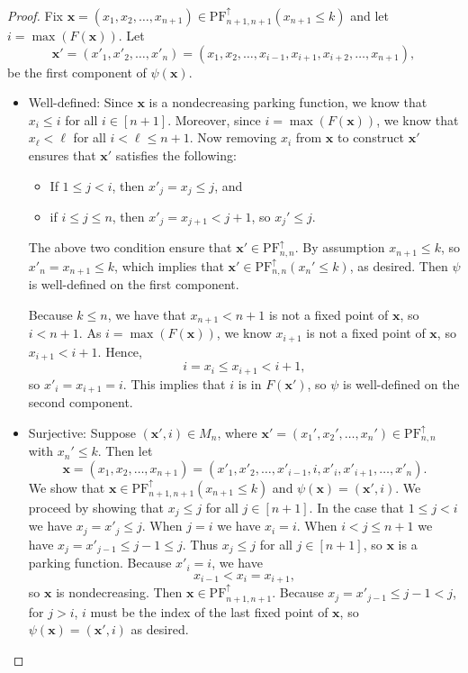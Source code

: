 \documentclass[11pt,reqno]{BICA}
\theoremstyle{definition}
\newcommand{\NDPF}{\mathrm{PF}^{\uparrow}}
\newcommand{\x}{\mathbf{x}}
\begin{document}
\begin{proof} Fix $\x=(x_1,x_2,\ldots,x_{n+1}) \in \NDPF_{n+1,n+1}(x_{n+1} \leq k)$ and  let $i=\max(F(\x))$. Let \[\x'=(x'_1,x'_2,\dots,x'_n)=(x_1,x_2,\ldots,x_{i-1},x_{i+1},x_{i+2},\ldots,x_{n+1}),\] be the first component of $\psi(\x)$.


    \begin{itemize}[leftmargin=.2in]
        \item Well-defined: 
        Since $\x$ is a nondecreasing parking function, we know that $x_i\leq i$ for all $i\in[n+1]$.
        Moreover, since $i=\max(F(\x))$, we know that $x_\ell<\ell$ for all $i<\ell\leq n+1$. 
        Now removing $x_i$ from $\x$ to construct $\x'$ ensures that $\x'$
        satisfies the following: 
        \begin{itemize}
            \item If $1\leq j < i$, then $x'_j = x_j\leq j$, and 
            \item if $i\leq j\leq n$, then $x'_j = x_{j+1}< j+1$, so $x_j'\leq j$.
        \end{itemize}
        The above two condition ensure that $\x'\in\NDPF_{n,n}$. 
        By assumption $x_{n+1}\leq k$, so $x'_n=x_{n+1}\leq k$, which implies that $\x'\in\NDPF_{n,n}(x_n'\leq k)$, as desired. 
        Then $\psi$ is well-defined on the first component. 
        
        Because $k\leq n$, we have that $x_{n+1} < n+1$ is not a fixed point of $\x$, so $i < n+1$. As $i=\max(F(\x))$, we know $x_{i+1}$ is not a fixed point of $\x$, so $x_{i+1} < i+1$. Hence, \begin{equation}\label{eq:fp-stays}i = x_i \leq x_{i+1} < i+1,\end{equation}
        so $x'_i = x_{i+1} = i$. This implies that $i$ is in $F(\x')$, so $\psi$ is well-defined on the second component.
    
        \item Surjective: Suppose $(\x', i) \in M_n$, where $\x'=(x_1',x_2',\ldots,x_n')\in\NDPF_{n,n}$ with $x_n'\leq k$. Then let
        \[\x =(x_1,x_2,\ldots,x_{n+1})= (x'_1, x'_2, \ldots, x'_{i-1}, i, x'_{i}, x'_{i+1}, \ldots, x'_{n}).\]
        We show that $\x\in\NDPF_{n+1,n+1}(x_{n+1}\leq k)$ and $\psi(\x) = (\x', i)$. We proceed by showing that $x_j\leq j$ for all $j\in[n+1]$.
        In the case that $1\leq j < i$ we have $x_j = x'_j \leq j$. 
        When $j = i$ we have $x_i = i$.
        When $i<j\leq n+1$ we have $x_j = x'_{j-1} \leq j-1 \leq j$.
        Thus $x_j\leq j$ for all $j\in[n+1]$, so $\x$ is a parking function. Because $x'_i = i$, we have
        \[x_{i-1} < x_i = x_{i+1},\]
        so $\x$ is nondecreasing. Then $\x \in \NDPF_{n+1,n+1}$. Because $x_j = x'_{j-1} \leq j-1 < j$, for $j>i$, $i$ must be the index of the last fixed point of $\x$, so $\psi(\x) = (\x', i)$ as desired.


\end{itemize}
\end{proof}
\end{document}

